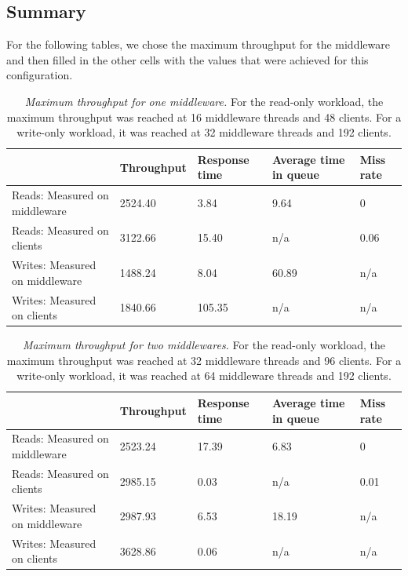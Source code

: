 \documentclass[11pt,a4paper]{article}
\begin{document}
\subsection{Summary}

For the following tables, we chose the maximum throughput for the middleware and then filled in the other cells with the values that were achieved for this configuration.

	\begin{table}[H]
	\centering
		\begin{tabular}{|l|p{2cm}|p{2cm}|p{2cm}|p{2cm}|}
			\hline                                						& Throughput 	& Response time 	& Average time in queue 	& Miss rate \\ 
			\hline Reads: Measured on middleware  &  2524.40 		& 3.84					& 9.64                      			& 0          \\ 
			\hline Reads: Measured on clients     		&  3122.66        	& 15.40          		& n/a                   				&  0.06         \\ 
			\hline Writes: Measured on middleware &  1488.24        	& 8.04             		& 60.89                      		& n/a       \\ 
			\hline Writes: Measured on clients    		&  1840.66        	& 105.35             	& n/a                   				& n/a       \\ 
			\hline 
		\end{tabular}
		\caption{\textit{Maximum throughput for one middleware.} For the read-only workload, the maximum throughput was reached at 16 middleware threads and 48 clients. For a write-only workload, it was reached at 32 middleware threads and 192 clients.}
		\label{Table:3_table_1}
	\end{table}


	\begin{table}[H]
	\centering
		\begin{tabular}{|l|p{2cm}|p{2cm}|p{2cm}|p{2cm}|}
			\hline                                						& Throughput 	& Response time 	& Average time in queue 	& Miss rate \\ 
			\hline Reads: Measured on middleware  & 2523.24         &  17.39    			& 6.83                      			& 0          \\ 
			\hline Reads: Measured on clients     		& 2985.15         	&   0.03            		& n/a                   				& 0.01          \\ 
			\hline Writes: Measured on middleware & 2987.93         	&  6.53             		&  18.19                     			& n/a       \\ 
			\hline Writes: Measured on clients    		& 3628.86        	&	0.06		             	& n/a                   				& n/a       \\ 
			\hline 
		\end{tabular}
		\caption{\textit{Maximum throughput for two middlewares.} For the read-only workload, the maximum throughput was reached at 32 middleware threads and 96 clients. For a write-only workload, it was reached at 64 middleware threads and 192 clients.}
		\label{Table:3_table_2}
	\end{table}
\end{document}
